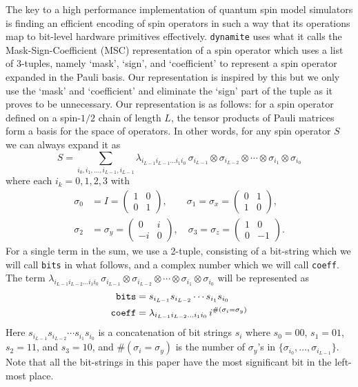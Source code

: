 \documentclass[preprint,12pt]{elsarticle}
\begin{document}
The key to a high performance implementation of quantum spin model simulators is finding an
efficient encoding of spin operators in such a way that its operations map to bit-level
hardware primitives effectively. {\tt dynamite} uses what it calls the Mask-Sign-Coefficient
(MSC) representation of a spin operator which uses a list of 3-tuples, namely `mask', `sign',
and `coefficient' to represent a spin operator expanded in the Pauli basis. Our representation
is inspired by this but we only use the `mask' and `coefficient' and eliminate the `sign' part
of the tuple as it proves to be unnecessary. Our representation is as follows: for a spin
operator defined on a spin-$1/2$ chain of length $L$, the tensor products of Pauli matrices
form a basis for the space of operators. In other words, for any spin operator $S$ we can
always expand it as
\[
S = \sum_{i_0,i_1,\ldots,i_{L-1},i_{L-1}} \lambda_{i_{L-1} i_{L-1} \ldots i_1 i_0}\,
\sigma_{i_{L-1}}\otimes\sigma_{i_{L-2}}\otimes\cdots\otimes\sigma_{i_1}\otimes\sigma_{i_0}
\]
where each $i_k=0,1,2,3$ with
\begin{align*}
\sigma_0 &= I = \left(\begin{matrix} 1 & 0 \\ 0 & 1 \end{matrix}\right),
\qquad\sigma_1 = \sigma_x = \left(\begin{matrix} 0 & 1 \\
  1 & 0 \end{matrix}\right), \\
\sigma_2 &= \sigma_y = \left(\begin{matrix} 0 & i \\ -i & 0 \end{matrix}\right),
\quad\sigma_3 = \sigma_z = \left(\begin{matrix} 1 & 0 \\ 0 & -1 \end{matrix}\right).
\end{align*}
For a single term in the sum, we use a 2-tuple, consisting of a
bit-string which we will call {\tt bits} in what follows, and a complex number which we
will call {\tt coeff}. The term $\lambda_{i_{L-1} i_{L-2} \ldots i_1 i_0}\,
\sigma_{i_{L-1}}\otimes\sigma_{i_{L-2}}\otimes\cdots\otimes\sigma_{i_1}\otimes\sigma_{i_0}$
will be represented as
\begin{align*}
  {\tt bits} &= s_{i_{L-1}} s_{i_{L-2}}\cdots s_{i_1} s_{i_0} \\
  {\tt coeff} &= \lambda_{i_{L-1} i_{L-2} \ldots i_1 i_0}\, i^{\#(\sigma_i = \sigma_y)}
\end{align*}
Here $s_{i_{L-1}} s_{i_{L-2}}\cdots s_{i_1} s_{i_0}$ is a concatenation of bit strings $s_i$ where
$s_0 = 00$, $s_1 = 01$, $s_2 = 11$, and $s_3 = 10$, and $\#(\sigma_i = \sigma_y)$ is the
number of $\sigma_y$'s in $\{\sigma_{i_0},\ldots,\sigma_{i_{L-1}}\}$. Note that all the
bit-strings in this paper have the most significant bit in the left-most place.
\end{document}
